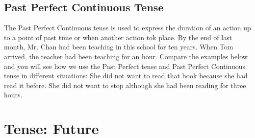 \subsection{Past Perfect Continuous Tense}
The Past Perfect Continuous tense is used to express the duration of an action
up to a point of past time or when another action tok place.
\newline
By the end of last month, Mr. Chan had been teaching in this school for ten
years.
\newline
When Tom arrived, the teacher had been teaching for an hour.
\newline
\newline
Compare the examples below and you will see how we use the Past Perfect tense
and Past Perfect Continuous tense in different situations:
\newline
\newline
She did not want to read that book because she had read it before.
\newline
She did not want to stop although she had been reading for three hours.

\section{Tense: Future}

